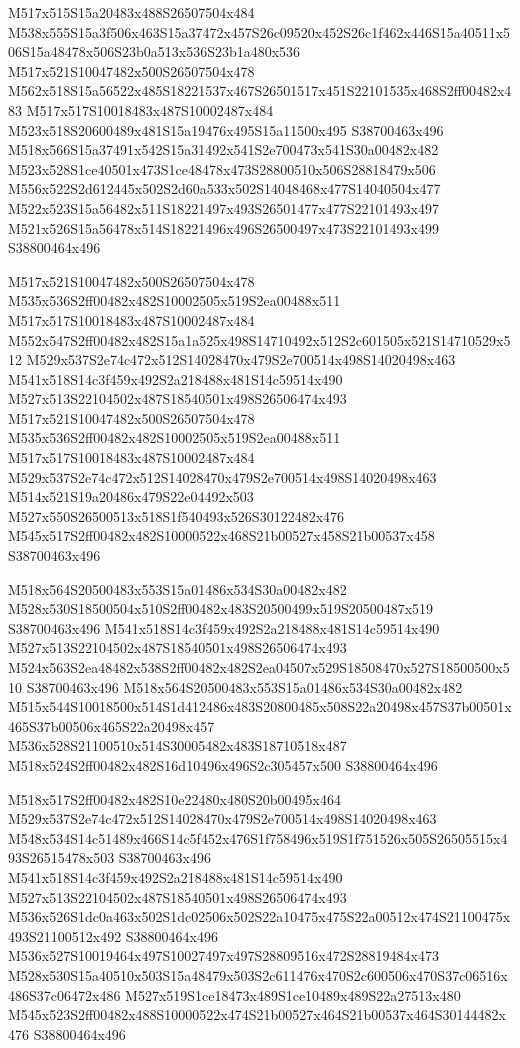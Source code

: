 \documentclass{article}
\begin{document}
\begin{multicols}{2}
M517x515S15a20483x488S26507504x484 M538x555S15a3f506x463S15a37472x457S26c09520x452S26c1f462x446S15a40511x506S15a48478x506S23b0a513x536S23b1a480x536 M517x521S10047482x500S26507504x478 M562x518S15a56522x485S18221537x467S26501517x451S22101535x468S2ff00482x483 M517x517S10018483x487S10002487x484 M523x518S20600489x481S15a19476x495S15a11500x495 S38700463x496 M518x566S15a37491x542S15a31492x541S2e700473x541S30a00482x482 M523x528S1ce40501x473S1ce48478x473S28800510x506S28818479x506 M556x522S2d612445x502S2d60a533x502S14048468x477S14040504x477 M522x523S15a56482x511S18221497x493S26501477x477S22101493x497 M521x526S15a56478x514S18221496x496S26500497x473S22101493x499 S38800464x496

M517x521S10047482x500S26507504x478 M535x536S2ff00482x482S10002505x519S2ea00488x511 M517x517S10018483x487S10002487x484 M552x547S2ff00482x482S15a1a525x498S14710492x512S2c601505x521S14710529x512 M529x537S2e74c472x512S14028470x479S2e700514x498S14020498x463 M541x518S14c3f459x492S2a218488x481S14c59514x490 M527x513S22104502x487S18540501x498S26506474x493 M517x521S10047482x500S26507504x478 M535x536S2ff00482x482S10002505x519S2ea00488x511 M517x517S10018483x487S10002487x484 M529x537S2e74c472x512S14028470x479S2e700514x498S14020498x463 M514x521S19a20486x479S22e04492x503 M527x550S26500513x518S1f540493x526S30122482x476 M545x517S2ff00482x482S10000522x468S21b00527x458S21b00537x458 S38700463x496

M518x564S20500483x553S15a01486x534S30a00482x482 M528x530S18500504x510S2ff00482x483S20500499x519S20500487x519 S38700463x496 M541x518S14c3f459x492S2a218488x481S14c59514x490 M527x513S22104502x487S18540501x498S26506474x493 M524x563S2ea48482x538S2ff00482x482S2ea04507x529S18508470x527S18500500x510 S38700463x496 M518x564S20500483x553S15a01486x534S30a00482x482 M515x544S10018500x514S1d412486x483S20800485x508S22a20498x457S37b00501x465S37b00506x465S22a20498x457 M536x528S21100510x514S30005482x483S18710518x487 M518x524S2ff00482x482S16d10496x496S2c305457x500 S38800464x496

M518x517S2ff00482x482S10e22480x480S20b00495x464 M529x537S2e74c472x512S14028470x479S2e700514x498S14020498x463 M548x534S14c51489x466S14c5f452x476S1f758496x519S1f751526x505S26505515x493S26515478x503 S38700463x496 M541x518S14c3f459x492S2a218488x481S14c59514x490 M527x513S22104502x487S18540501x498S26506474x493 M536x526S1dc0a463x502S1dc02506x502S22a10475x475S22a00512x474S21100475x493S21100512x492 S38800464x496 M536x527S10019464x497S10027497x497S28809516x472S28819484x473 M528x530S15a40510x503S15a48479x503S2c611476x470S2c600506x470S37c06516x486S37c06472x486 M527x519S1ce18473x489S1ce10489x489S22a27513x480 M545x523S2ff00482x488S10000522x474S21b00527x464S21b00537x464S30144482x476 S38800464x496


\end{multicols}
\end{document}
